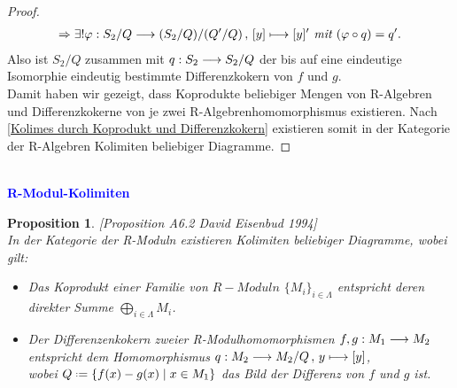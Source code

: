 \documentclass[10pt,a4paper]{report}
\newcommand{\ModulsOfDifferenzials}{David Eisenbud 1994}
\newcounter{Aussage}[chapter]
\newtheorem{prop}[Aussage]{Proposition}
\newcommand{\functionfront}[3]{\nolinebreak{#1:#2 \longrightarrow #3}}
\newcommand{\function}[5]{\nolinebreak{#1:#2 \longrightarrow #3 \, , \, #4 \longmapsto #5}}
\newcommand*{\defeq}{\mathrel{\vcenter{\baselineskip0.5ex \lineskiplimit0pt
                     \hbox{\scriptsize.}\hbox{\scriptsize.}}}%
                     =}
\begin{document}
\begin{proof}
\begin{gather*}
\Rightarrow \exists ! \function{\varphi}{S_2/Q}{(S_2/Q)/(Q'/Q)}{[y]}{[y]'}\textit{ mit }(\varphi \circ q) = q'.
\end{gather*}
Also ist $S_2/Q$ zusammen mit $\functionfront{q}{S_2}{S_2/Q}$ der bis auf eine eindeutige Isomorphie eindeutig bestimmte Differenzkokern von $f$ und $g$.\\
Damit haben wir gezeigt, dass Koprodukte beliebiger Mengen von R-Algebren und Differenzkokerne von je zwei R-Algebrenhomomorphismus existieren. Nach \cref{Kolimes durch Koprodukt und Differenzkokern} existieren somit in der Kategorie der R-Algebren Kolimiten beliebiger Diagramme.
\end{proof}


\ \\
\textcolor{blue}{\textbf{R-Modul-Kolimiten}}
\begin{prop}\label{R-Modul-Kolimiten} \textit{[Proposition A6.2 \ModulsOfDifferenzials]}\\
In der Kategorie der R-Moduln existieren Kolimiten beliebiger Diagramme, wobei gilt:
\begin{itemize}
\item[\textbf{1.}] Das Koprodukt einer Familie von $R-Moduln$ $\lbrace M_i \rbrace_{i \in \Lambda}$ entspricht deren direkter Summe $\bigoplus_{i \in \Lambda} M_i$.
\item[\textbf{2.}] Der Differenzenkokern zweier R-Modulhomomorphismen $\functionfront{f,g}{M_1}{M_2}$ entspricht dem Homomorphismus $\function{q}{M_2}{M_2/Q}{y}{[y]}$,\\
wobei $Q \defeq \lbrace f(x) - g(x)\mid x \in M_1 \rbrace$ das Bild der Differenz von $f$ und $g$ ist.
\end{itemize}
\end{prop}
\end{document}
